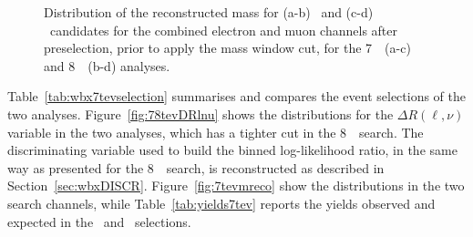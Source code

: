 \begin{figure}[h!tb]
\begin{center}
	\caption[bla]{Distribution of the reconstructed mass for 
        (a-b) \wi\ and (c-d) \wii\ candidates
        for the combined electron and muon channels after preselection,
        prior to apply the mass window cut, for the 7~\tev\ (a-c) and 8~\tev\ (b-d) analyses.
        \label{fig:7tevmwhad}}
\end{center}\end{figure}
Table~\ref{tab:wbx7tevselection} summarises and compares the event selections
of the two analyses. 
Figure~\ref{fig:78tevDRlnu} shows the
distributions for the $\Delta R(\ell,\nu)$ variable in the
two analyses, which has a tighter cut 
in the 8~\tev\  search. The discriminating variable used 
to build the binned log-likelihood ratio, in the same 
way as presented for the 8~\tev\ search, is reconstructed
as described in Section~\ref{sec:wbxDISCR}. Figure~\ref{fig:7tevmreco}
show the distributions in the two search channels, while Table~\ref{tab:yields7tev}
reports the yields observed and expected in the \loose\ and \tight\ selections.


